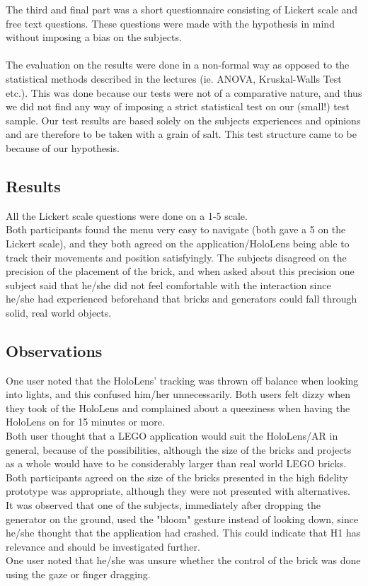 The third and final part was a short questionnaire consisting of Lickert scale and free text questions. These questions were made with the hypothesis in mind without imposing a bias on the subjects.\\
\\
The evaluation on the results were done in a non-formal way as opposed to the statistical methods described in the lectures (ie. ANOVA, Kruskal-Walls Test etc.). This was done because our tests were not of a comparative nature, and thus we did not find any way of imposing a strict statistical test on our (small!) test sample. Our test results are based solely on the subjects experiences and opinions and are therefore to be taken with a grain of salt. This test structure came to be because of our hypothesis.

\subsection{Results}
All the Lickert scale questions were done on a 1-5 scale.\\
Both participants found the menu very easy to navigate (both gave a 5 on the Lickert scale), and they both agreed on the application/HoloLens being able to track their movements and position satisfyingly. The subjects disagreed on the precision of the placement of the brick, and when asked about this precision one subject said that he/she did not feel comfortable with the interaction since he/she had experienced beforehand that bricks and generators could fall through solid, real world objects.\\

\subsection{Observations}
One user noted that the HoloLens' tracking was thrown off balance when looking into lights, and this confused him/her unnecessarily. Both users felt dizzy when they took of the HoloLens and complained about a queeziness when having the HoloLens on for 15 minutes or more.\\
Both user thought that a LEGO application would suit the HoloLens/AR in general, because of the possibilities, although the size of the bricks and projects as a whole would have to be considerably larger than real world LEGO bricks. Both participants agreed on the size of the bricks presented in the high fidelity prototype was appropriate, although they were not presented with alternatives.\\
It was observed that one of the subjects, immediately after dropping the generator on the ground, used the "bloom" gesture instead of looking down, since he/she thought that the application had crashed. This could indicate that H1 has relevance and should be investigated further.\\
One user noted that he/she was unsure whether the control of the brick was done using the gaze or finger dragging.